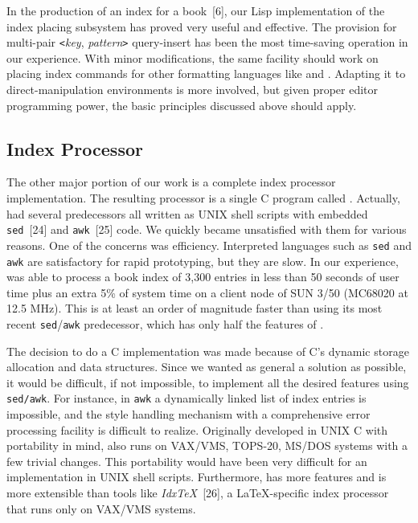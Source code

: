In the production of an index for a book~[6], our {\E} Lisp
implementation of the index placing subsystem has proved very useful
and effective.  The provision for multi-pair
\verb|<|{\it key\/}, {\it pattern\/}\verb|>| query-insert has been the most
time-saving operation in our experience.
With minor modifications, the same facility should work on
placing index commands for other formatting languages like
{\TF} and {\SB}.  Adapting it to direct-manipulation environments is more
involved, but given proper editor programming power,
the basic principles discussed above should apply.

\subsection{Index Processor}
The other major portion of our work is
a complete index processor implementation.
The resulting processor
is a single C program called {\MI}.  Actually, {\MI}
had several predecessors all written as UNIX shell scripts with
embedded \verb|sed|~[24] and \verb|awk|~[25] code.
We quickly became unsatisfied with them for various reasons.
One of the concerns was efficiency.  
Interpreted languages such as \verb|sed| and \verb|awk| are satisfactory for
rapid prototyping, but they are slow.
In our experience, {\MI} was able to process
a book index of 3,300 entries in less
than 50 seconds of user time plus an extra 5\% of system time on
a client node of SUN 3/50 (MC68020 at 12.5 MHz).
This is at least an order of magnitude faster than
using its most recent \verb|sed|/\verb|awk| predecessor, which has only
half the features of {\MI}.


The decision to do a C implementation was made because of C's dynamic
storage allocation and data structures.
Since we wanted as general a solution as possible, it would be difficult,
if not impossible, to implement all the desired features using \verb|sed/awk|.
For instance, in \verb|awk| a dynamically linked list of index entries is
impossible, and the style handling mechanism with a comprehensive error
processing facility is difficult to realize.  Originally developed
in UNIX C with portability in mind, {\MI} also runs on VAX/VMS,
TOPS-20, MS/DOS systems with a few trivial changes.
This portability would have
been very difficult for an implementation in UNIX shell scripts.
Furthermore, {\MI} has more features and is more extensible than tools like
{\sl Idx{\TeX}\/}~[26], a {\LaTeX}-specific index processor
that runs only on VAX/VMS systems.

